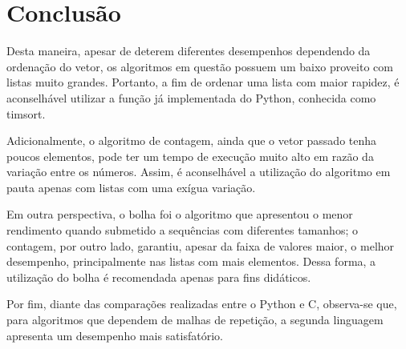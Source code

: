 \section{Conclusão}
Desta maneira, apesar de deterem diferentes desempenhos dependendo da ordenação do vetor, os algoritmos em questão possuem um baixo proveito com listas muito grandes. Portanto, a fim de ordenar uma lista com maior rapidez, é aconselhável utilizar a função já implementada do Python, conhecida como timsort.

Adicionalmente, o algoritmo de contagem, ainda que o vetor passado tenha poucos elementos, pode ter um tempo de execução muito alto em razão da variação entre os números. Assim, é aconselhável a utilização do algoritmo em pauta apenas com listas com uma exígua variação.

Em outra perspectiva, o bolha foi o algoritmo que apresentou o menor rendimento quando submetido a sequências com diferentes tamanhos; o contagem, por outro lado, garantiu, apesar da faixa de valores maior, o melhor desempenho, principalmente nas listas com mais elementos. Dessa forma, a utilização do bolha é recomendada apenas para fins didáticos.


Por fim, diante das comparações realizadas entre o Python e C, observa-se que, para algoritmos que dependem de malhas de repetição, a segunda linguagem apresenta um desempenho mais satisfatório.